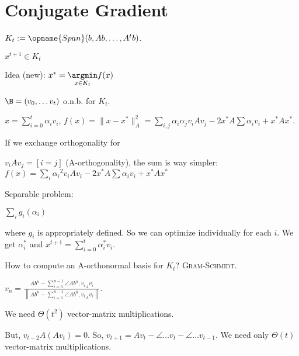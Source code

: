 \section{Conjugate Gradient}

$K_t := \opname{Span}(b, Ab, \ldots, A^t b)$.

\begin{proposition}
    $x^{t+1} \in K_t$
\end{proposition}


Idea (new): $x^* = \underset{x\in K_t}{\argmin} f(x)$\;


$\B = (v_0,\ldots v_t)$ o.n.b. for $K_t$.

$x = \sum\limits_{i=0}^t \alpha_i v_i$, $f(x) = \lVert x-x^* \rVert_A^2 = \sum\limits_{i,j} \alpha_i\alpha_j v_iAv_j -2x^*A\sum\alpha_iv_i + x^*Ax^*$.

If we exchange orthogonality for

$v_i A v_j = [i=j]$ (A-orthogonality), the sum is way simpler: $f(x) = \sum\limits_{i} {\alpha_i}^2 v_iAv_i -2x^*A\sum\alpha_iv_i + x^*Ax^*$


Separable problem:

$\sum\limits_i g_i(\alpha_i)$

where $g_i$ is appropriately defined. So we can optimize individually for each $i$. We get $\alpha_i^*$ and $x^{t+1} = \sum\limits_{i=0}^t \alpha_i^* v_i$.

How to compute an A-orthonormal basis for $K_t$? \textsc{Gram-Schmidt}.

$v_n = \frac{Ab^{n} - \sum\limits_{i=0}^{n-1}\angle{Ab^n, v_i}_Av_i}{\left\lVert Ab^{n} - \sum\limits_{i=0}^{n-1}\angle{Ab^n, v_i}_Av_i \right\rVert}$.

We need $\Theta(t^2)$ vector-matrix multiplications.

But, $v_{t-2}A(Av_t) = 0$. So, $v_{t+1} = Av_t - \angle{\ldots}v_t - \angle{\ldots}v_{t-1}$. We need only $\Theta(t)$ vector-matrix multiplications.






